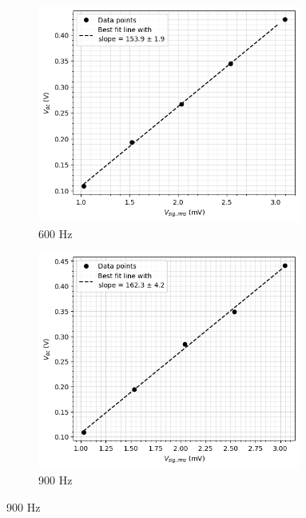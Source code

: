     \begin{figure}[H]
    \ContinuedFloat
     
    \bigskip
    \begin{subfigure}{\linewidth}
    \includegraphics[width=0.95\textwidth]{images/a2.png}
    \caption{600 Hz}
    \end{subfigure}
    
    \bigskip
    \begin{subfigure}{\linewidth}
    \includegraphics[width=0.95\textwidth]{images/a3.png}
    \caption{900 Hz}
    \end{subfigure}


\end{figure}
